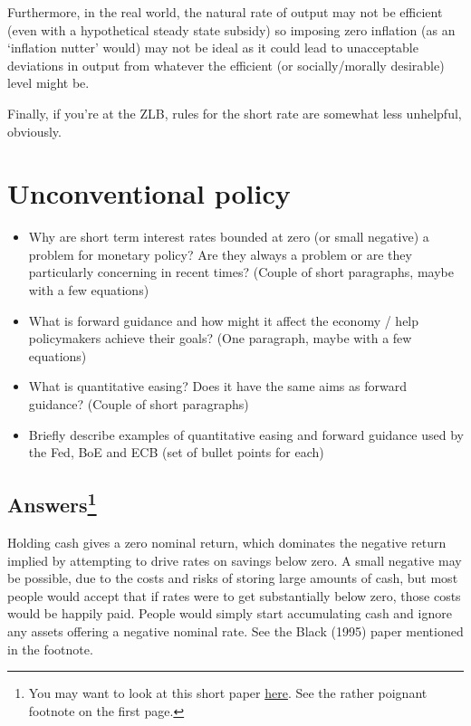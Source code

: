 \documentclass[authoryear,11pt]{elsarticle}
\begin{document}
Furthermore, in the real world, the natural rate of output may not be efficient (even with a hypothetical steady state subsidy) so imposing zero inflation (as an `inflation nutter' would) may not be ideal as it could lead to unacceptable deviations in output from whatever the efficient (or socially/morally desirable) level might be.

Finally, if you're at the ZLB, rules for the short rate are somewhat less unhelpful, obviously.

\section{Unconventional policy}
\begin{itemize}
\item	Why are short term interest rates bounded at zero (or small negative) a problem for monetary policy? Are they always a problem or are they particularly concerning in recent times? (Couple of short paragraphs, maybe with a few equations)
\item	What is forward guidance and how might it affect the economy / help policymakers achieve their goals? (One paragraph, maybe with a few equations)
\item	What is quantitative easing? Does it have the same aims as forward guidance? (Couple of short paragraphs)
\item	Briefly describe examples of quantitative easing and forward guidance used by the Fed, BoE and ECB (set of bullet points for each)
\end{itemize}

\subsection*{Answers\footnote{You may want to look at this short paper \href{https://www.jstor.org/stable/2329320}{here}. See the rather poignant footnote on the first page.}}
Holding cash gives a zero nominal return, which dominates the negative return implied by attempting to drive rates on savings below zero. A small negative may be possible, due to the costs and risks of storing large amounts of cash, but most people would accept that if rates were to get substantially below zero, those costs would be happily paid. People would simply start accumulating cash and ignore any assets offering a negative nominal rate. See the Black (1995) paper mentioned in the footnote.
\end{document}
